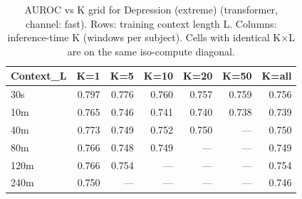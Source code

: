 \begin{table}[ht]
\centering
\caption{AUROC vs K grid for Depression (extreme) (transformer, channel: fast). Rows: training context length L. Columns: inference-time K (windows per subject). Cells with identical K×L are on the same iso-compute diagonal.}
\label{tab:kgrid_depression_extreme_binary_transformer_fast}
\begin{tabular}{lrrrrrr}
\toprule
Context_L & K=1 & K=5 & K=10 & K=20 & K=50 & K=all \\
\midrule
30s & 0.797 & 0.776 & 0.760 & 0.757 & 0.759 & 0.756 \\
10m & 0.765 & 0.746 & 0.741 & 0.740 & 0.738 & 0.739 \\
40m & 0.773 & 0.749 & 0.752 & 0.750 & — & 0.750 \\
80m & 0.766 & 0.748 & 0.749 & — & — & 0.749 \\
120m & 0.766 & 0.754 & — & — & — & 0.754 \\
240m & 0.750 & — & — & — & — & 0.746 \\
\bottomrule
\end{tabular}
\end{table}